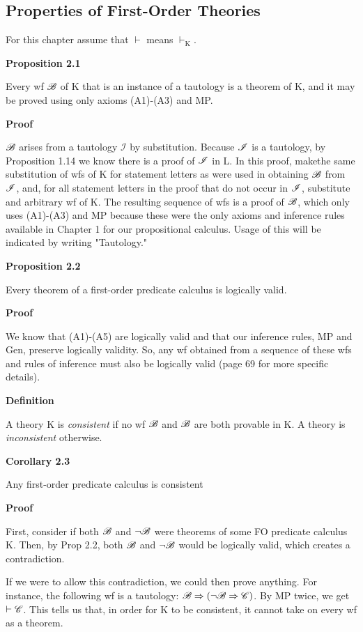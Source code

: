 \subsection{Properties of First-Order Theories}

 For this chapter assume that $\vdash$ means $\vdash_\text{K}$. 

\textbf{Proposition 2.1}

Every wf $\mathscr{B}$ of K that is an instance of a tautology is a theorem of K, and it may be proved using only axioms (A1)-(A3) and MP. 

\textbf{Proof}

$\mathscr{B}$ arises from a tautology $\mathscr{I}$ by substitution. Because $\mathscr{I}$ is a tautology, by Proposition 1.14 we know there is a proof of $\mathscr{I}$ in L. In this proof, makethe same substitution of wfs of K for statement letters as were used in obtaining $\mathscr{B}$ from $\mathscr{I}$, and, for all statement letters in the proof that do not occur in $\mathscr{I}$, substitute and arbitrary wf of K. The resulting sequence of wfs is a proof of $\mathscr{B}$, which only uses (A1)-(A3) and MP because these were the only axioms and inference rules available in Chapter 1 for our propositional calculus. Usage of this will be indicated by writing "Tautology."

\textbf{Proposition 2.2} 

Every theorem of a first-order predicate calculus is logically valid. 

\textbf{Proof}

We know that (A1)-(A5) are logically valid and that our inference rules, MP and Gen, preserve logically validity. So, any wf obtained from a sequence of these wfs and rules of inference must also be logically valid (page 69 for more specific details).

\textbf{Definition}

A theory K is \textit{consistent} if no wf $\mathscr{B}$ and $\mathscr{B}$ are both provable in K. A theory is \textit{inconsistent} otherwise.

\textbf{Corollary 2.3}

Any first-order predicate calculus is consistent

\textbf{Proof}

First, consider if both $\mathscr{B}$ and $\lnot \mathscr{B}$ were theorems of some FO predicate calculus K. Then, by Prop 2.2, both $\mathscr{B}$ and $\lnot \mathscr{B}$ would be logically valid, which creates a contradiction.

If we were to allow this contradiction, we could then prove anything. For instance, the following wf is a tautology: $\mathscr{B} \Rightarrow (\lnot \mathscr{B} \Rightarrow \mathscr{C})$. By MP twice, we get $\vdash \mathscr{C}$. This tells us that, in order for K to be consistent, it cannot take on every wf as a theorem.

